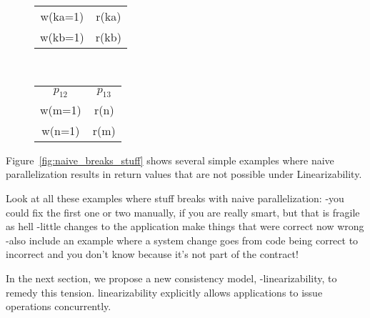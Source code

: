 \begin{figure*}
\begin{subfigure}[t]{.2\linewidth}
\begin{center}
\begin{tabular}{ c c }
 w(ka=1) & r(ka) \\  
 w(kb=1) & r(kb)    
\end{tabular}
\caption{}
\end{center}
\end{subfigure}
~
\begin{subfigure}[t]{.2\linewidth}
\begin{center}
\begin{tabular}{ c c }
 $p_{12}$ & $p_{13}$ \\
 w(m=1) & r(n) \\  
 w(n=1) & r(m)    
\end{tabular}
\caption{}
\end{center}
\end{subfigure}
\caption{}
\label{fig:naive_breaks_stuff}
\end{figure*}

Figure~\ref{fig:naive_breaks_stuff} shows several simple examples where naive parallelization results in return values that are not possible under Linearizability. 

Look at all these examples where stuff breaks with naive parallelization:
-you could fix the first one or two manually, if you are really smart, but that is fragile as hell
-little changes to the application make things that were correct now wrong
-also include an example where a system change goes from code being correct to incorrect and you don't know because it's not part of the contract!



In the next section, we propose a new \multidispatch{} 
consistency model, \md{}-linearizability, to remedy this 
tension. \Multidispatch{} linearizability explicitly allows 
applications to issue operations concurrently.

